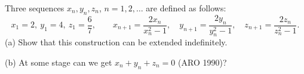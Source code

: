 Three sequences $x_n, y_n, z_n$, $n = 1, 2, \ldots$ are defined as follows:
\[ x_1 = 2,\ y_1 = 4,\ z_1 = \frac{6}{7},\qquad x_{n+1} = \frac{2x_n}{x_n^2 - 1},\quad y_{n+1} = \frac{2y_n}{y_n^2 - 1},\quad z_{n+1} = \frac{2z_n}{z_n^2 - 1}. \]
(a) Show that this construction can be extended indefinitely.

(b) At some stage can we get $x_n + y_n + z_n = 0$ (ARO 1990)?
